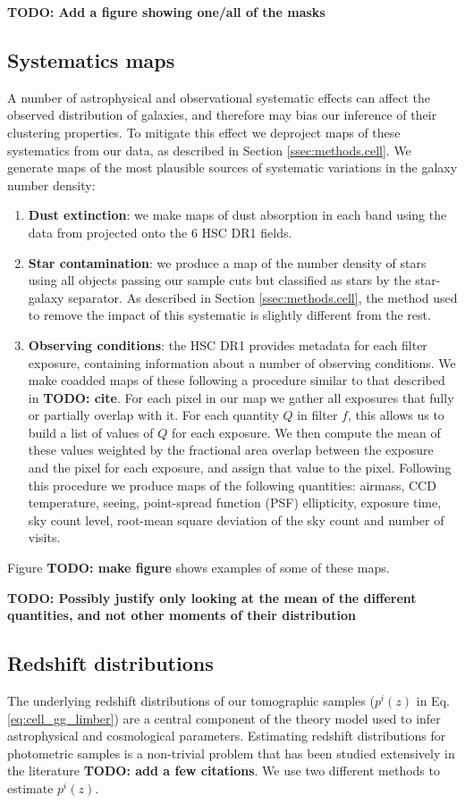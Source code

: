 \documentclass[a4paper,11pt]{article}
\newcommand{\todo}[1]{{\bf TODO: #1}}
\begin{document}
    \todo{Add a figure showing one/all of the masks}

  \subsection{Systematics maps}\label{ssec:methods.syst}
    A number of astrophysical and observational systematic effects can affect the observed distribution of galaxies, and therefore may bias our inference of their clustering properties. To mitigate this effect we deproject maps of these systematics from our data, as described in Section \ref{ssec:methods.cell}. We generate maps of the most plausible sources of systematic variations in the galaxy number density:
    \begin{enumerate}
      \item {\bf Dust extinction}: we make maps of dust absorption in each band using the data from \cite{1998ApJ...500..525S} projected onto the 6 HSC DR1 fields.
      \item {\bf Star contamination}: we produce a map of the number density of stars using all objects passing our sample cuts but classified as stars by the star-galaxy separator. As described in Section \ref{ssec:methods.cell}, the method used to remove the impact of this systematic is slightly different from the rest.
      \item {\bf Observing conditions}: the HSC DR1 provides metadata for each filter exposure, containing information about a number of observing conditions. We make coadded maps of these following a procedure similar to that described in \todo{cite}. For each pixel in our map we gather all exposures that fully or partially overlap with it. For each quantity $Q$ in filter $f$, this allows us to build a list of values of $Q$ for each exposure. We then compute the mean of these values weighted by the fractional area overlap between the exposure and the pixel for each exposure, and assign that value to the pixel. Following this procedure we produce maps of the following quantities: airmass, CCD temperature, seeing, point-spread function (PSF) ellipticity, exposure time, sky count level, root-mean square deviation of the sky count and number of visits.
    \end{enumerate}
    Figure \todo{make figure} shows examples of some of these maps.

    \todo{Possibly justify only looking at the mean of the different quantities, and not other moments of their distribution}

  \subsection{Redshift distributions}\label{ssec:methods.nz}
    The underlying redshift distributions of our tomographic samples ($p^i(z)$ in Eq. \ref{eq:cell_gg_limber}) are a central component of the theory model used to infer astrophysical and cosmological parameters. Estimating redshift distributions for photometric samples is a non-trivial problem that has been studied extensively in the literature \todo{add a few citations}. We use two different methods to estimate $p^i(z)$.
    
\end{document}
